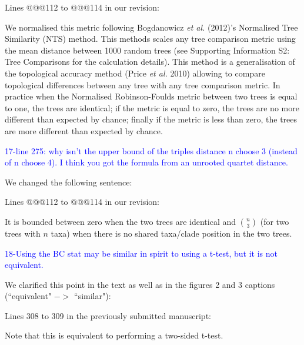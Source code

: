 \documentclass[11pt]{letter}
\begin{document}
\begin{letter}{}
Lines @@@112 to @@@114 in our revision:

\hfill\begin{minipage}{\dimexpr\textwidth-1cm}
We normalised this metric following Bogdanowicz \textit{et al.} (2012)'s Normalised Tree Similarity (NTS) method. This methods scales %
any tree comparison metric using the mean distance between 1000 random trees (see Supporting Information S2: Tree Comparisons for the calculation details). This method is a generalisation of the topological accuracy method (Price \textit{et al.} 2010) allowing to compare topological differences between any tree with any tree comparison metric. In practice when the Normalised Robinson-Foulds metric between two trees is equal to one, the trees are identical; if the metric is equal to zero, the trees are no more different than expected by chance; finally if the metric is less than zero, the trees are more different than expected by chance.
\end{minipage}


\textcolor{blue}{17-line 275: why isn't the upper bound of the triples distance n choose 3 (instead of n choose 4). I think you got the formula from an unrooted quartet distance.}

We changed the following sentence: %

Lines @@@112 to @@@114 in our revision:

\hfill\begin{minipage}{\dimexpr\textwidth-1cm}
It is bounded between zero when the two trees are identical and $\binom{n}{3}$ (for two trees with $n$ taxa) when there is no shared taxa/clade position in the two trees.
\end{minipage}



\textcolor{blue}{18-Using the BC stat may be similar in spirit to using a t-test, but it is not equivalent.}

We clarified this point in the text as well as in the figures 2 and 3 captions (``equivalent" $->$ ``similar"):

Lines 308 to 309 in the previously submitted manuscript:

\hfill\begin{minipage}{\dimexpr\textwidth-1cm}
Note that this is equivalent to performing a two-sided t-test.
\end{minipage}


\end{letter}
\end{document}
